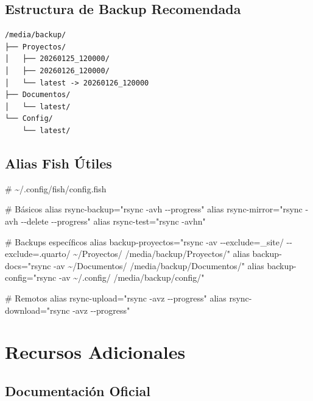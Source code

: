 \documentclass[
  doc,
  floatsintext,
  longtable,
  a4paper,
  nolmodern,
  notxfonts,
  notimes,
  12pt,
  colorlinks=true,linkcolor=blue,citecolor=blue,urlcolor=blue]{apa7}
\newenvironment{Shaded}{\begin{snugshade}}{\end{snugshade}}
\newcommand{\NormalTok}[1]{\textcolor[rgb]{0.00,0.23,0.31}{#1}}
\begin{document}
\subsection{Estructura de Backup
Recomendada}\label{estructura-de-backup-recomendada}

\begin{verbatim}
/media/backup/
├── Proyectos/
│   ├── 20260125_120000/
│   ├── 20260126_120000/
│   └── latest -> 20260126_120000
├── Documentos/
│   └── latest/
└── Config/
    └── latest/
\end{verbatim}

\subsection{Alias Fish Útiles}\label{alias-fish-uxfatiles}

\begin{Shaded}
\begin{Highlighting}[]
\NormalTok{\# \textasciitilde{}/.config/fish/config.fish}

\NormalTok{\# Básicos}
\NormalTok{alias rsync{-}backup="rsync {-}avh {-}{-}progress"}
\NormalTok{alias rsync{-}mirror="rsync {-}avh {-}{-}delete {-}{-}progress"}
\NormalTok{alias rsync{-}test="rsync {-}avhn"}

\NormalTok{\# Backups específicos}
\NormalTok{alias backup{-}proyectos="rsync {-}av {-}{-}exclude=\textquotesingle{}\_site/\textquotesingle{} {-}{-}exclude=\textquotesingle{}.quarto/\textquotesingle{} \textasciitilde{}/Proyectos/ /media/backup/Proyectos/"}
\NormalTok{alias backup{-}docs="rsync {-}av \textasciitilde{}/Documentos/ /media/backup/Documentos/"}
\NormalTok{alias backup{-}config="rsync {-}av \textasciitilde{}/.config/ /media/backup/config/"}

\NormalTok{\# Remotos}
\NormalTok{alias rsync{-}upload="rsync {-}avz {-}{-}progress"}
\NormalTok{alias rsync{-}download="rsync {-}avz {-}{-}progress"}
\end{Highlighting}
\end{Shaded}

\section{Recursos Adicionales}\label{recursos-adicionales}

\subsection{Documentación Oficial}\label{documentaciuxf3n-oficial}
\end{document}
